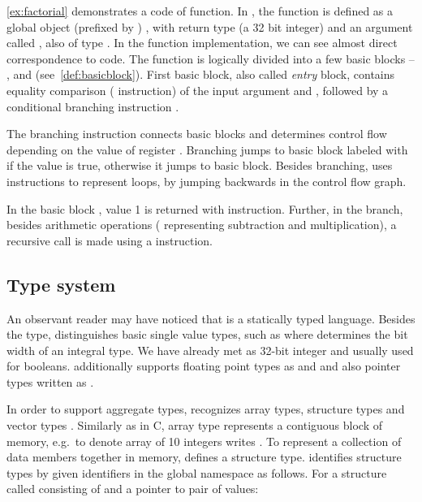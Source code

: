 \autoref{ex:factorial} demonstrates a code of  function. In
\LLVM, the  function is defined as a global object (prefixed by
)  , with
return type  (a 32 bit integer) and an argument called ,
also of type . In the function implementation, we can see almost
direct correspondence to \Cpp{} code. The function is logically divided into a
few basic blocks -- ,  and 
(see~\autoref{def:basicblock}). First basic block, also called \emph{entry}
block, contains equality comparison ( instruction) of the input
argument  and , followed by a conditional branching
instruction .

The branching instruction connects basic blocks and determines control flow
depending on the value of register . Branching jumps to basic
block labeled with  if the value  is true,
otherwise it jumps to  basic block. Besides branching, \LLVM
uses  instructions to represent loops, by jumping backwards in the
control flow graph.

In the basic block , value 1 is returned with 
instruction. Further, in the  branch, besides arithmetic operations
( representing subtraction and  multiplication), a
recursive call is made using a  instruction.

\subsection{Type system} \label{subsec:typesystem}

An observant reader may have noticed that \LLVMIR is a statically typed
language.  Besides the  type, \LLVM distinguishes basic single value
types, such as  where  determines the bit width of an integral
type. We have already met  as 32-bit integer and  usually
used for booleans.  \LLVM additionally supports floating point types as
 and  and also pointer types written as .

In order to support aggregate types, \LLVM recognizes array types, structure types
and vector types \cite{LLVM:langref}. Similarly as in C, array type represents a
contiguous block of memory, e.g.~to denote array of 10 integers
\LLVM writes \code{[10 × i32]}. To represent a collection of data members
together in memory, \LLVM defines a structure type. \LLVM identifies structure types
by given identifiers in the global namespace as follows. For a structure called
 consisting of  and a pointer to pair of 
values:


